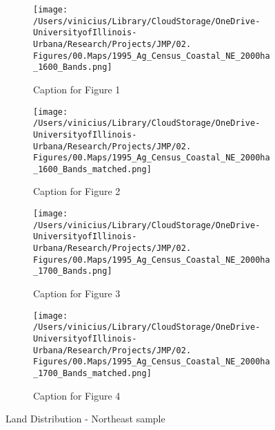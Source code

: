 \documentclass[11pt]{article}
\begin{document}
\begin{landscape}
  \begin{figure}[htbp]
    \centering
    \begin{subfigure}[b]{0.65\textwidth}
        \centering
        \texttt{[image: /Users/vinicius/Library/CloudStorage/OneDrive-UniversityofIllinois-Urbana/Research/Projects/JMP/02. Figures/00.Maps/1995\_Ag\_Census\_Coastal\_NE\_2000ha\_1600\_Bands.png]}
        \caption{Caption for Figure 1}
        \label{fig:fig1}
    \end{subfigure}
    \hfill
    \begin{subfigure}[b]{0.65\textwidth}
        \centering
        \texttt{[image: /Users/vinicius/Library/CloudStorage/OneDrive-UniversityofIllinois-Urbana/Research/Projects/JMP/02. Figures/00.Maps/1995\_Ag\_Census\_Coastal\_NE\_2000ha\_1600\_Bands\_matched.png]}
        \caption{Caption for Figure 2}
        \label{fig:fig2}
    \end{subfigure}

    \vspace{0.1cm} %

    \begin{subfigure}[b]{0.65\textwidth}
        \centering
        \texttt{[image: /Users/vinicius/Library/CloudStorage/OneDrive-UniversityofIllinois-Urbana/Research/Projects/JMP/02. Figures/00.Maps/1995\_Ag\_Census\_Coastal\_NE\_2000ha\_1700\_Bands.png]}
        \caption{Caption for Figure 3}
        \label{fig:fig3}
    \end{subfigure}
    \hfill
    \begin{subfigure}[b]{0.65\textwidth}
        \centering
        \texttt{[image: /Users/vinicius/Library/CloudStorage/OneDrive-UniversityofIllinois-Urbana/Research/Projects/JMP/02. Figures/00.Maps/1995\_Ag\_Census\_Coastal\_NE\_2000ha\_1700\_Bands\_matched.png]}
        \caption{Caption for Figure 4}
        \label{fig:fig4}
    \end{subfigure}

    \vspace{1cm}

    \caption{Land Distribution -  Northeast sample}
    \label{fig:robustness_NE_landsize_distance_cutoff}
    
\end{figure}
\end{landscape}

\clearpage
\end{document}
